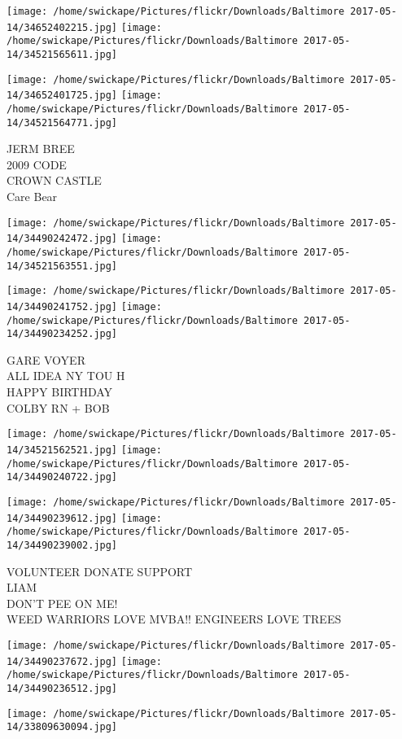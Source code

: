 \documentclass[10pt,letterpaper]{article}
\begin{document}
\texttt{[image: /home/swickape/Pictures/flickr/Downloads/Baltimore 2017-05-14/34652402215.jpg]}
\texttt{[image: /home/swickape/Pictures/flickr/Downloads/Baltimore 2017-05-14/34521565611.jpg]}

\texttt{[image: /home/swickape/Pictures/flickr/Downloads/Baltimore 2017-05-14/34652401725.jpg]}
\texttt{[image: /home/swickape/Pictures/flickr/Downloads/Baltimore 2017-05-14/34521564771.jpg]}

JERM BREE\\
2009 CODE\\
CROWN CASTLE\\
Care Bear
\pagebreak

\texttt{[image: /home/swickape/Pictures/flickr/Downloads/Baltimore 2017-05-14/34490242472.jpg]}
\texttt{[image: /home/swickape/Pictures/flickr/Downloads/Baltimore 2017-05-14/34521563551.jpg]}

\texttt{[image: /home/swickape/Pictures/flickr/Downloads/Baltimore 2017-05-14/34490241752.jpg]}
\texttt{[image: /home/swickape/Pictures/flickr/Downloads/Baltimore 2017-05-14/34490234252.jpg]}

GARE VOYER\\
ALL IDEA NY TOU H\\
HAPPY BIRTHDAY\\
COLBY RN + BOB
\pagebreak

\texttt{[image: /home/swickape/Pictures/flickr/Downloads/Baltimore 2017-05-14/34521562521.jpg]}
\texttt{[image: /home/swickape/Pictures/flickr/Downloads/Baltimore 2017-05-14/34490240722.jpg]}

\texttt{[image: /home/swickape/Pictures/flickr/Downloads/Baltimore 2017-05-14/34490239612.jpg]}
\texttt{[image: /home/swickape/Pictures/flickr/Downloads/Baltimore 2017-05-14/34490239002.jpg]}

VOLUNTEER DONATE SUPPORT\\
LIAM\\
DON'T PEE ON ME!\\
WEED WARRIORS LOVE MVBA!!  ENGINEERS LOVE TREES
\pagebreak

\texttt{[image: /home/swickape/Pictures/flickr/Downloads/Baltimore 2017-05-14/34490237672.jpg]}
\texttt{[image: /home/swickape/Pictures/flickr/Downloads/Baltimore 2017-05-14/34490236512.jpg]}

\vspace{0.25in}
\texttt{[image: /home/swickape/Pictures/flickr/Downloads/Baltimore 2017-05-14/33809630094.jpg]}
\end{document}
